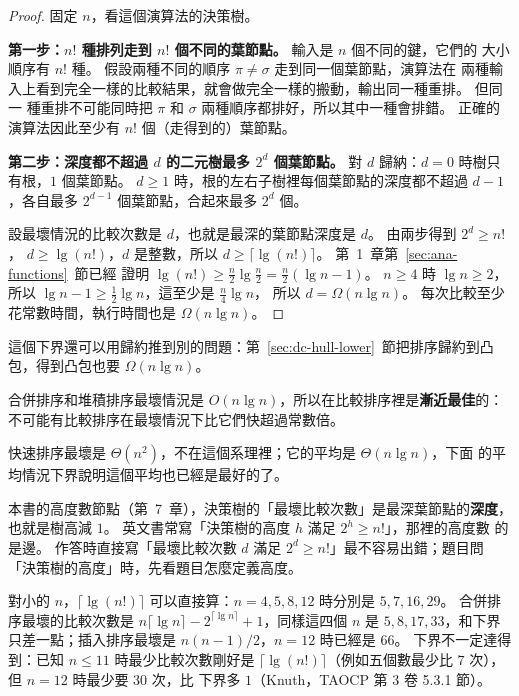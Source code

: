 \begin{proof}
固定 $n$，看這個演算法的決策樹。

\textbf{第一步：$n!$ 種排列走到 $n!$ 個不同的葉節點。} 輸入是 $n$ 個不同的鍵，它們的
大小順序有 $n!$ 種。 假設兩種不同的順序 $\pi \ne \sigma$ 走到同一個葉節點，演算法在
兩種輸入上看到完全一樣的比較結果，就會做完全一樣的搬動，輸出同一種重排。 但同一
種重排不可能同時把 $\pi$ 和 $\sigma$ 兩種順序都排好，所以其中一種會排錯。 正確的
演算法因此至少有 $n!$ 個（走得到的）葉節點。

\textbf{第二步：深度都不超過 $d$ 的二元樹最多 $2^d$ 個葉節點。} 對 $d$ 歸納：$d = 0$
時樹只有根，$1$ 個葉節點。 $d \ge 1$ 時，根的左右子樹裡每個葉節點的深度都不超過
$d - 1$，各自最多 $2^{d-1}$ 個葉節點，合起來最多 $2^d$ 個。

設最壞情況的比較次數是 $d$，也就是最深的葉節點深度是 $d$。 由兩步得到 $2^d \ge n!$，
$d \ge \lg(n!)$，$d$ 是整數，所以 $d \ge \lceil \lg(n!) \rceil$。 第~1~章第~\ref{sec:ana-functions}~節已經
證明 $\lg(n!) \ge \frac{n}{2}\lg\frac{n}{2} = \frac{n}{2}(\lg n - 1)$。 $n \ge 4$ 時
$\lg n \ge 2$，所以 $\lg n - 1 \ge \frac{1}{2}\lg n$，這至少是 $\frac{n}{4}\lg n$，
所以 $d = \Omega(n \lg n)$。 每次比較至少花常數時間，執行時間也是 $\Omega(n \lg n)$。
\end{proof}

這個下界還可以用歸約推到別的問題：第~\ref{sec:dc-hull-lower}~節把排序歸約到凸包，得到凸包也要 $\Omega(n \lg n)$。

\begin{corollary}
\label{cor:lin-optimal}
合併排序和堆積排序最壞情況是 $O(n \lg n)$，所以在比較排序裡是\textbf{漸近最佳}的：
不可能有比較排序在最壞情況下比它們快超過常數倍。
\end{corollary}

快速排序最壞是 $\Theta(n^2)$，不在這個系理裡；它的平均是 $\Theta(n \lg n)$，下面
的平均情況下界說明這個平均也已經是最好的了。

\begin{examnote}
本書的高度數節點（第~7~章），決策樹的「最壞比較次數」是最深葉節點的\textbf{深度}，
也就是樹高減 $1$。 英文書常寫「決策樹的高度 $h$ 滿足 $2^h \ge n!$」，那裡的高度數
的是邊。 作答時直接寫「最壞比較次數 $d$ 滿足 $2^d \ge n!$」最不容易出錯；題目問
「決策樹的高度」時，先看題目怎麼定義高度。
\end{examnote}

對小的 $n$，$\lceil \lg(n!) \rceil$ 可以直接算：$n = 4, 5, 8, 12$ 時分別是
$5, 7, 16, 29$。 合併排序最壞的比較次數是 $n\lceil \lg n \rceil - 2^{\lceil \lg n
\rceil} + 1$，同樣這四個 $n$ 是 $5, 8, 17, 33$，和下界只差一點；插入排序最壞是
$n(n-1)/2$，$n = 12$ 時已經是 $66$。 下界不一定達得到：已知 $n \le 11$ 時最少比較次數剛好是
$\lceil \lg(n!) \rceil$（例如五個數最少比 $7$ 次），但 $n = 12$ 時最少要 $30$ 次，比
下界多 $1$（Knuth，TAOCP 第 3 卷 5.3.1 節）。

